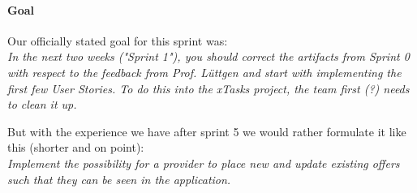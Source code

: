 \usepackage{booktabs}\paragraph{Goal}
Our officially stated goal for this sprint was:\\
\textit{In the next two weeks ("Sprint 1"), you should correct the artifacts from Sprint 0 with respect to the feedback from Prof. Lüttgen and start with implementing the first few User Stories. To do this into the xTasks project, the team first (?) needs to clean it up.}

But with the experience we have after sprint 5 we would rather formulate it like this (shorter and on point):\\
\textit{Implement the possibility for a provider to place new and update existing offers such that they can be seen in the application.}








